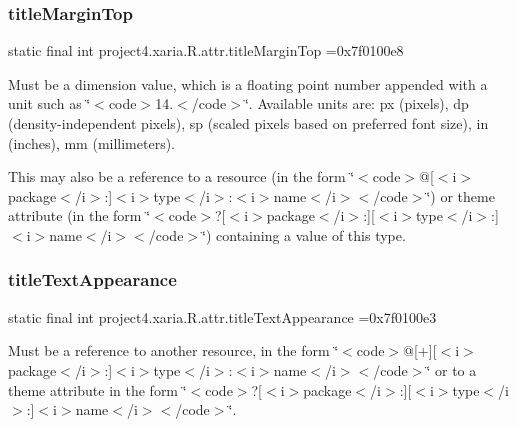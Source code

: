 \subsubsection{\texorpdfstring{title\+Margin\+Top}{titleMarginTop}}
{\footnotesize\ttfamily static final int project4.\+xaria.\+R.\+attr.\+title\+Margin\+Top =0x7f0100e8\hspace{0.3cm}{\ttfamily [static]}}

Must be a dimension value, which is a floating point number appended with a unit such as \char`\"{}$<$code$>$14.\+5sp$<$/code$>$\char`\"{}. Available units are\+: px (pixels), dp (density-\/independent pixels), sp (scaled pixels based on preferred font size), in (inches), mm (millimeters). 

This may also be a reference to a resource (in the form \char`\"{}$<$code$>$@\mbox{[}$<$i$>$package$<$/i$>$\+:\mbox{]}$<$i$>$type$<$/i$>$\+:$<$i$>$name$<$/i$>$$<$/code$>$\char`\"{}) or theme attribute (in the form \char`\"{}$<$code$>$?\mbox{[}$<$i$>$package$<$/i$>$\+:\mbox{]}\mbox{[}$<$i$>$type$<$/i$>$\+:\mbox{]}$<$i$>$name$<$/i$>$$<$/code$>$\char`\"{}) containing a value of this type. \mbox{\label{classproject4_1_1xaria_1_1R_1_1attr_a90b3b1240e8abc49d8ee162f3f988853}} 
\subsubsection{\texorpdfstring{title\+Text\+Appearance}{titleTextAppearance}}
{\footnotesize\ttfamily static final int project4.\+xaria.\+R.\+attr.\+title\+Text\+Appearance =0x7f0100e3\hspace{0.3cm}{\ttfamily [static]}}

Must be a reference to another resource, in the form \char`\"{}$<$code$>$@\mbox{[}+\mbox{]}\mbox{[}$<$i$>$package$<$/i$>$\+:\mbox{]}$<$i$>$type$<$/i$>$\+:$<$i$>$name$<$/i$>$$<$/code$>$\char`\"{} or to a theme attribute in the form \char`\"{}$<$code$>$?\mbox{[}$<$i$>$package$<$/i$>$\+:\mbox{]}\mbox{[}$<$i$>$type$<$/i$>$\+:\mbox{]}$<$i$>$name$<$/i$>$$<$/code$>$\char`\"{}. \mbox{\label{classproject4_1_1xaria_1_1R_1_1attr_a27138be6d8688a31b14accd2825e1b55}} 
